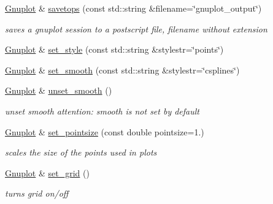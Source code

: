 \begin{DoxyCompactItemize}
\mbox{\label{class_gnuplot_a032072c7c01b508a7535a17fb08562b1}} 
\mbox{\hyperlink{class_gnuplot}{Gnuplot}} \& \mbox{\hyperlink{class_gnuplot_a032072c7c01b508a7535a17fb08562b1}{savetops}} (const std\+::string \&filename=\char`\"{}gnuplot\+\_\+output\char`\"{})
\begin{DoxyCompactList}\small\item\em saves a gnuplot session to a postscript file, filename without extension \end{DoxyCompactList}\item 
\mbox{\hyperlink{class_gnuplot}{Gnuplot}} \& \mbox{\hyperlink{class_gnuplot_acfdcda292650775ebed4683e8e1515b5}{set\+\_\+style}} (const std\+::string \&stylestr=\char`\"{}points\char`\"{})
\item 
\mbox{\hyperlink{class_gnuplot}{Gnuplot}} \& \mbox{\hyperlink{class_gnuplot_aa18386919da2ec4c994f1f9c7195d384}{set\+\_\+smooth}} (const std\+::string \&stylestr=\char`\"{}csplines\char`\"{})
\item 
\mbox{\hyperlink{class_gnuplot}{Gnuplot}} \& \mbox{\hyperlink{class_gnuplot_ad9dfbccd66dece1dbe5803605c6ab08c}{unset\+\_\+smooth}} ()
\begin{DoxyCompactList}\small\item\em unset smooth attention\+: smooth is not set by default \end{DoxyCompactList}\item 
\mbox{\label{class_gnuplot_a95ec1636a871447dfe99463b769339c7}} 
\mbox{\hyperlink{class_gnuplot}{Gnuplot}} \& \mbox{\hyperlink{class_gnuplot_a95ec1636a871447dfe99463b769339c7}{set\+\_\+pointsize}} (const double pointsize=1.)
\begin{DoxyCompactList}\small\item\em scales the size of the points used in plots \end{DoxyCompactList}\item 
\mbox{\label{class_gnuplot_a5416c8e81f1b9945b9631fa85a8d4f47}} 
\mbox{\hyperlink{class_gnuplot}{Gnuplot}} \& \mbox{\hyperlink{class_gnuplot_a5416c8e81f1b9945b9631fa85a8d4f47}{set\+\_\+grid}} ()
\begin{DoxyCompactList}\small\item\em turns grid on/off \end{DoxyCompactList}\item 
\mbox{\label{class_gnuplot_a53183e1487bc6977f0d46bf75d19b4d3}} 

\end{DoxyCompactItemize}
